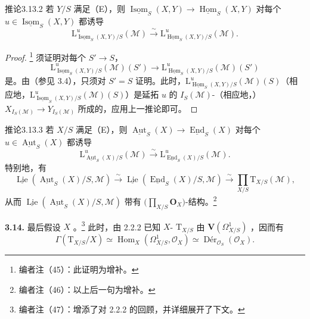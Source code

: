 \begin{SGAresult}{推论}{3.13.2}
若 $Y/S$ 满足（E），则 $\underline{\operatorname{Isom}}_S(X,Y)\to\underline{\operatorname{Hom}}_S(X,Y)$ 对每个 $u\in\underline{\operatorname{Isom}}_S(X,Y)$ 都诱导
\[
\mathrm L^u_{\underline{\operatorname{Isom}}_S(X,Y)/S}(\mathcal M)
\xrightarrow\sim\mathrm L^u_{\underline{\operatorname{Hom}}_S(X,Y)/S}(\mathcal M).
\]
\end{SGAresult}
\begin{proof}
\footnote{编者注（45）：此证明为增补。} 须证明对每个 $S'\to S$，
\[
\mathrm L^u_{\underline{\operatorname{Isom}}_S(X,Y)/S}(\mathcal M)(S')
\longrightarrow\mathrm L^u_{\underline{\operatorname{Hom}}_S(X,Y)/S}(\mathcal M)(S')
\]
是。由（参见 3.4），只须对 $S'=S$ 证明。此时，$\mathrm L^u_{\underline{\operatorname{Hom}}_S(X,Y)/S}(\mathcal M)(S)$（相应地，$\mathrm L^u_{\underline{\operatorname{Isom}}_S(X,Y)/S}(\mathcal M)(S)$）是延拓 $u$ 的 $I_S(\mathcal M)$-（相应地，）$X_{I_S(\mathcal M)}\to Y_{I_S(\mathcal M)}$ 所成的，应用上一推论即可。
\end{proof}
\begin{SGAresult}{推论}{3.13.3}
若 $X/S$ 满足（E），则 $\underline{\operatorname{Aut}}_S(X)\to\underline{\operatorname{End}}_S(X)$ 对每个 $u\in\underline{\operatorname{Aut}}_S(X)$ 都诱导
\[
\mathrm L^u_{\underline{\operatorname{Aut}}_S(X)/S}(\mathcal M)
\xrightarrow\sim\mathrm L^u_{\underline{\operatorname{End}}_S(X)/S}(\mathcal M).
\]
特别地，有
\[
\underline{\operatorname{Lie}}(\underline{\operatorname{Aut}}_S(X)/S,\mathcal M)
\xrightarrow\sim\underline{\operatorname{Lie}}(\underline{\operatorname{End}}_S(X)/S,\mathcal M)
\xrightarrow\sim\prod_{X/S}\mathrm T_{X/S}(\mathcal M),
\]
从而 $\underline{\operatorname{Lie}}(\underline{\operatorname{Aut}}_S(X)/S,\mathcal M)$ 带有 $\bigl(\prod_{X/S}\mathbf O_X\bigr)$-结构。\footnote{编者注（46）：以上后一句为增补。}
\end{SGAresult}
\textbf{3.14.} 最后假设 $X$ 。\footnote{编者注（47）：增添了对 2.2.2 的回顾，并详细展开了下文。} 此时，由 2.2.2 已知 $X$- $\mathrm T_{X/S}$ 由 $\mathbf V(\Omega^1_{X/S})$ ，因而有
\[
\Gamma(\mathrm T_{X/S}/X)\simeq\operatorname{Hom}_X(\Omega^1_{X/S},\mathcal O_X)
\simeq\operatorname{D\text{é}r}_{\mathcal O_S}(\mathcal O_X).
\]
